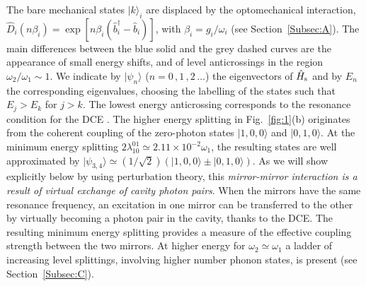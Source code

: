 \documentclass[aps,pra,twocolumn,floatfix,longbibliography, superscriptaddress]{revtex4-1}
\begin{document}
The bare mechanical states $|k\rangle_i$ are displaced by the optomechanical interaction, $\hat D_i(n \beta_i)= \exp[{n \beta_i (\hat b_i^\dag - \hat b_i)}]$, with $\beta_i = g_i/\omega_{i}$ (see Section~\ref{Subsec:A}).
The main differences between the blue solid and the grey dashed curves are the appearance of small energy shifts, and of level anticrossings in the region $\omega_2 / \omega_1 \sim 1$. 
We indicate by $|\psi_n \rangle$ ($n = 0\,, 1\,, 2\, \dots$) the eigenvectors of $\hat H_{\rm s}$ and by  $E_n$ the corresponding eigenvalues, choosing the labelling of the states such that $E_j > E_k$ for $j>k$. The lowest energy   anticrossing corresponds to the resonance condition for the DCE \cite{Macri2017}.
The higher energy splitting in  Fig.~\ref{fig:1}(b) originates from the coherent coupling of the zero-photon states $|1,0,0 \rangle$ and $|0,1,0 \rangle$. At the minimum energy splitting $2 \lambda^{01}_{10} \simeq 2.11 \times 10^{-2} \omega_1$, the
resulting states are well approximated by $|\psi_{3,4} \rangle \simeq (1/\sqrt{2}) (|1,0,0 \rangle \pm |0,1,0 \rangle)$.
As we will show explicitly below by using perturbation theory, this {\it mirror-mirror interaction is a result of 
virtual exchange of cavity photon pairs}. When the mirrors have the same resonance frequency, an excitation in one mirror can be transferred to the other by virtually becoming a photon pair in the cavity, thanks to the DCE.
The resulting minimum energy splitting provides a measure of the effective coupling strength between the two mirrors.
At higher energy for $\omega_2 \simeq \omega_1$ a ladder of increasing level splittings, involving higher number phonon states, is present (see Section~\ref{Subsec:C}).
\end{document}
